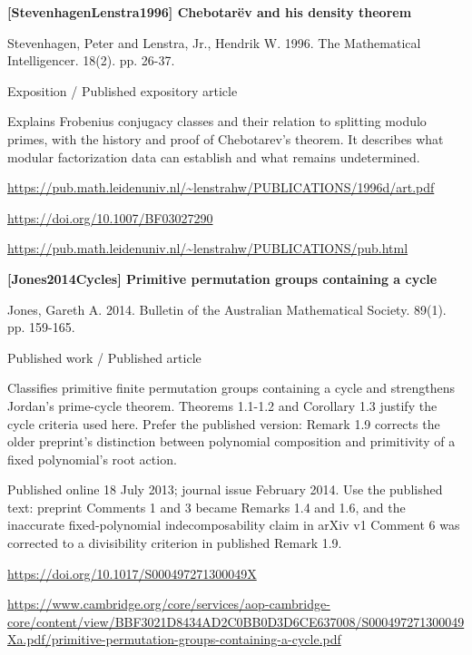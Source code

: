 \documentclass[11pt,a4paper,oneside,openany]{book}
\begin{document}
\vspace{9pt}
\hypertarget{ref:StevenhagenLenstra1996}{}
{\sffamily\bfseries\color{atlasgreen}[StevenhagenLenstra1996] Chebotarëv and his density theorem}\par
\color{black} Stevenhagen, Peter and Lenstra, Jr., Hendrik W. 1996. The Mathematical Intelligencer. 18(2). pp. 26-37.\par
{\small\sffamily\color{atlasgold}Exposition / Published expository article}\par
\color{black} Explains Frobenius conjugacy classes and their relation to splitting modulo primes, with the history and proof of Chebotarev's theorem. It describes what modular factorization data can establish and what remains undetermined.\par
{\footnotesize\url{https://pub.math.leidenuniv.nl/~lenstrahw/PUBLICATIONS/1996d/art.pdf}}\par
{\footnotesize\url{https://doi.org/10.1007/BF03027290}}\par
{\footnotesize\url{https://pub.math.leidenuniv.nl/~lenstrahw/PUBLICATIONS/pub.html}}\par
\vspace{9pt}
\hypertarget{ref:Jones2014Cycles}{}
{\sffamily\bfseries\color{atlasgreen}[Jones2014Cycles] Primitive permutation groups containing a cycle}\par
\color{black} Jones, Gareth A. 2014. Bulletin of the Australian Mathematical Society. 89(1). pp. 159-165.\par
{\small\sffamily\color{atlasgold}Published work / Published article}\par
\color{black} Classifies primitive finite permutation groups containing a cycle and strengthens Jordan's prime-cycle theorem. Theorems 1.1-1.2 and Corollary 1.3 justify the cycle criteria used here. Prefer the published version: Remark 1.9 corrects the older preprint's distinction between polynomial composition and primitivity of a fixed polynomial's root action.\par
{\small Published online 18 July 2013; journal issue February 2014. Use the published text: preprint Comments 1 and 3 became Remarks 1.4 and 1.6, and the inaccurate fixed-polynomial indecomposability claim in arXiv v1 Comment 6 was corrected to a divisibility criterion in published Remark 1.9.}\par
{\footnotesize\url{https://doi.org/10.1017/S000497271300049X}}\par
{\footnotesize\url{https://www.cambridge.org/core/services/aop-cambridge-core/content/view/BBF3021D8434AD2C0BB0D3D6CE637008/S000497271300049Xa.pdf/primitive-permutation-groups-containing-a-cycle.pdf}}\par
\end{document}
